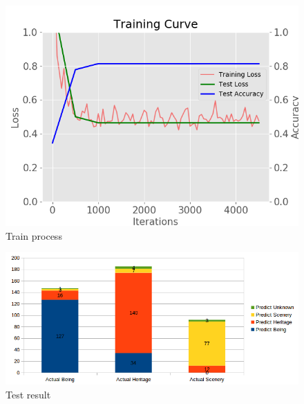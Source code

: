 \documentclass[11pt]{article}
\begin{document}
\begin{figure}[H]
\centering
\includegraphics[width=1\textwidth]{images/train_large_dataset_gamma_0_01}
\caption{Train process}
\end{figure}

\begin{figure}[H]
\centering
\includegraphics[width=1\textwidth]{images/test_large_dataset_gamma_0_01}
\caption{Test result}
\end{figure}



\end{document}
